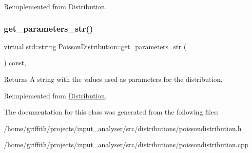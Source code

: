 Reimplemented from \hyperlink{classDistribution_a478a0c7b72d3ad266a2b6f1b9ed20fe9}{Distribution}.

\mbox{\label{classPoissonDistribution_a48e471c3bcae5b197a576f61777e67f3}} 
\subsubsection{\texorpdfstring{get\+\_\+parameters\+\_\+str()}{get\_parameters\_str()}}
{\footnotesize\ttfamily virtual std\+::string Poisson\+Distribution\+::get\+\_\+parameters\+\_\+str (\begin{DoxyParamCaption}{ }\end{DoxyParamCaption}) const\hspace{0.3cm}{\ttfamily [inline]}, {\ttfamily [virtual]}}

\begin{DoxyReturn}{Returns}
A string with the values used as parameters for the distribution. 
\end{DoxyReturn}


Reimplemented from \hyperlink{classDistribution_a716b7df9facb6bb016f46ac130297f9c}{Distribution}.



The documentation for this class was generated from the following files\+:\begin{DoxyCompactItemize}
\item 
/home/griffith/projects/input\+\_\+analyser/src/distributions/poissondistribution.\+h\item 
/home/griffith/projects/input\+\_\+analyser/src/distributions/poissondistribution.\+cpp\end{DoxyCompactItemize}
